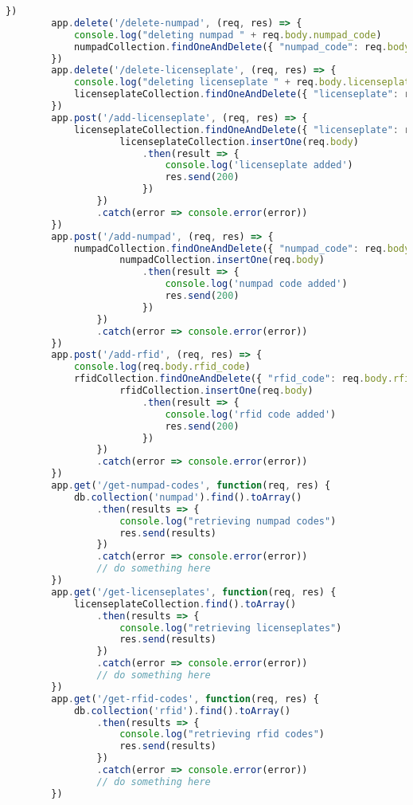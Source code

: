 \begin{lstlisting}[language=JavaScript, caption=Server code, label=lst:impl:server]
        })
        app.delete('/delete-numpad', (req, res) => {
            console.log("deleting numpad " + req.body.numpad_code)
            numpadCollection.findOneAndDelete({ "numpad_code": req.body.numpad_code }).then(result => { res.sendStatus(200) })
        })
        app.delete('/delete-licenseplate', (req, res) => {
            console.log("deleting licenseplate " + req.body.licenseplate)
            licenseplateCollection.findOneAndDelete({ "licenseplate": req.body.licenseplate }).then(result => { res.sendStatus(200) })
        })
        app.post('/add-licenseplate', (req, res) => {
            licenseplateCollection.findOneAndDelete({ "licenseplate": req.body.licenseplate }).then(result => {
                    licenseplateCollection.insertOne(req.body)
                        .then(result => {
                            console.log('licenseplate added')
                            res.send(200)
                        })
                })
                .catch(error => console.error(error))
        })
        app.post('/add-numpad', (req, res) => {
            numpadCollection.findOneAndDelete({ "numpad_code": req.body.numpad_code }).then(result => {
                    numpadCollection.insertOne(req.body)
                        .then(result => {
                            console.log('numpad code added')
                            res.send(200)
                        })
                })
                .catch(error => console.error(error))
        })
        app.post('/add-rfid', (req, res) => {
            console.log(req.body.rfid_code)
            rfidCollection.findOneAndDelete({ "rfid_code": req.body.rfid_code }).then(result => {
                    rfidCollection.insertOne(req.body)
                        .then(result => {
                            console.log('rfid code added')
                            res.send(200)
                        })
                })
                .catch(error => console.error(error))
        })
        app.get('/get-numpad-codes', function(req, res) {
            db.collection('numpad').find().toArray()
                .then(results => {
                    console.log("retrieving numpad codes")
                    res.send(results)
                })
                .catch(error => console.error(error))
                // do something here
        })
        app.get('/get-licenseplates', function(req, res) {
            licenseplateCollection.find().toArray()
                .then(results => {
                    console.log("retrieving licenseplates")
                    res.send(results)
                })
                .catch(error => console.error(error))
                // do something here
        })
        app.get('/get-rfid-codes', function(req, res) {
            db.collection('rfid').find().toArray()
                .then(results => {
                    console.log("retrieving rfid codes")
                    res.send(results)
                })
                .catch(error => console.error(error))
                // do something here
        })



\end{lstlisting}
